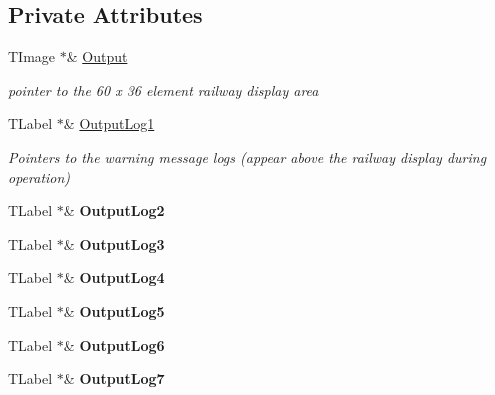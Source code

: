 \subsection*{Private Attributes}
\begin{DoxyCompactItemize}
\item 
\mbox{\label{class_t_display_a0e442bbdf413812064b3d0d200261cbc}} 
T\+Image $\ast$\& \mbox{\hyperlink{class_t_display_a0e442bbdf413812064b3d0d200261cbc}{Output}}
\begin{DoxyCompactList}\small\item\em pointer to the 60 x 36 element railway display area \end{DoxyCompactList}\item 
\mbox{\label{class_t_display_a62d6c2b2040a469fb6eb6177a8acc1f2}} 
T\+Label $\ast$\& \mbox{\hyperlink{class_t_display_a62d6c2b2040a469fb6eb6177a8acc1f2}{Output\+Log1}}
\begin{DoxyCompactList}\small\item\em Pointers to the warning message logs (appear above the railway display during operation) \end{DoxyCompactList}\item 
\mbox{\label{class_t_display_ad7a9ab1d203557810bdbfe39fad79855}} 
T\+Label $\ast$\& {\bfseries Output\+Log2}
\item 
\mbox{\label{class_t_display_ae099b334095873971b46f5c4c5e0bd2e}} 
T\+Label $\ast$\& {\bfseries Output\+Log3}
\item 
\mbox{\label{class_t_display_a4084cb29429480cfe74c86d84e376009}} 
T\+Label $\ast$\& {\bfseries Output\+Log4}
\item 
\mbox{\label{class_t_display_af5ac89214b13057a1bf2dae88b3dac96}} 
T\+Label $\ast$\& {\bfseries Output\+Log5}
\item 
\mbox{\label{class_t_display_a3adf5d70fb01209e746cb3cd490294b4}} 
T\+Label $\ast$\& {\bfseries Output\+Log6}
\item 
\mbox{\label{class_t_display_a1b134b87e594c2cd261210023fd11161}} 
T\+Label $\ast$\& {\bfseries Output\+Log7}

\end{DoxyCompactItemize}

